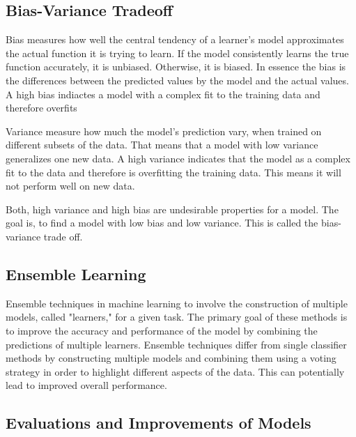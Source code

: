\subsection{Bias-Variance Tradeoff}
Bias measures how well the central tendency of a learner's model approximates the actual function it is trying to learn. If the model consistently learns the true function accurately, it is unbiased. Otherwise, it is biased. \cite[p. 7-8]{neal_biasvariancetradeofftextbooks_2019}
In essence the bias is the differences between the predicted values by the model and the actual values.
A high bias indiactes a model with a complex fit to the training data and therefore overfits \cite[p. 20]{neal_biasvariancetradeofftextbooks_2019} 

Variance measure how much the model's prediction vary, when trained on different subsets of the data. That means that a model with low variance generalizes one new data. A high variance indicates that the model as a complex fit to the data and therefore is overfitting the training data. This means it will not perform well on new data. \cite[p. 7-8]{neal_biasvariancetradeofftextbooks_2019}

Both, high variance and high bias are undesirable properties for a model. The goal is, to find a model with low bias and low variance. This is called the bias-variance trade off. \cite[p. 9]{neal_biasvariancetradeofftextbooks_2019}


\subsection{Ensemble Learning}
Ensemble techniques in machine learning to involve the construction of multiple models, called "learners," for a given task. The primary goal of these methods is to improve the accuracy and performance of the model by combining the predictions of multiple learners. Ensemble techniques differ from single classifier methods by constructing multiple models and combining them using a voting strategy in order to highlight different aspects of the data. This can potentially lead to improved overall performance. \cite[p. 253]{shaik_briefsurveyrandom_2019}

\subsection{Evaluations and Improvements of Models}
